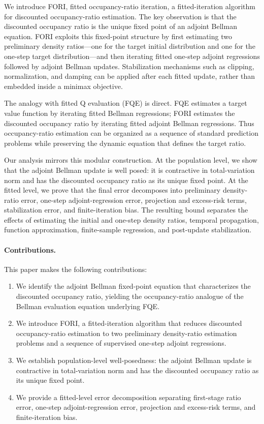 \documentclass{article}
\newcommand{\1}{\mathbf{1}}
\theoremstyle{plain}
\theoremstyle{definition}
\theoremstyle{remark}
\begin{document}
We introduce \textsc{FORI}, fitted occupancy-ratio iteration, a fitted-iteration
algorithm for discounted occupancy-ratio estimation. The key observation is that
the discounted occupancy ratio is the unique fixed point of an adjoint Bellman
equation. \textsc{FORI} exploits this fixed-point structure by first estimating
two preliminary density ratios---one for the target initial distribution and
one for the one-step target distribution---and then iterating fitted one-step
adjoint regressions followed by adjoint Bellman updates. Stabilization
mechanisms such as clipping, normalization, and damping can be applied after
each fitted update, rather than embedded inside a minimax objective.

The analogy with fitted Q evaluation (FQE) is direct. FQE estimates a target
value function by iterating fitted Bellman regressions; \textsc{FORI} estimates
the discounted occupancy ratio by iterating fitted adjoint Bellman regressions.
Thus occupancy-ratio estimation can be organized as a sequence of standard
prediction problems while preserving the dynamic equation that defines the
target ratio.

Our analysis mirrors this modular construction. At the population level, we show
that the adjoint Bellman update is well posed: it is contractive in
total-variation norm and has the discounted occupancy ratio as its unique fixed
point. At the fitted level, we prove that the final error decomposes into
preliminary density-ratio error, one-step adjoint-regression error, projection
and excess-risk terms, stabilization error, and finite-iteration bias. The
resulting bound separates the effects of estimating the initial and one-step
density ratios, temporal propagation, function approximation, finite-sample
regression, and post-update stabilization.


\paragraph{Contributions.} This paper makes the following contributions:
\begin{enumerate}
    \item We identify the adjoint Bellman fixed-point equation that
    characterizes the discounted occupancy ratio, yielding the occupancy-ratio
    analogue of the Bellman evaluation equation underlying FQE.

    \item We introduce \textsc{FORI}, a fitted-iteration algorithm that reduces
    discounted occupancy-ratio estimation to two preliminary density-ratio
    estimation problems and a sequence of supervised one-step adjoint regressions.

    \item We establish population-level well-posedness: the adjoint Bellman
    update is contractive in total-variation norm and has the discounted
    occupancy ratio as its unique fixed point.

    \item We provide a fitted-level error decomposition separating first-stage
    ratio error, one-step adjoint-regression error, projection and excess-risk terms,
    and finite-iteration bias.
\end{enumerate}
\end{document}
